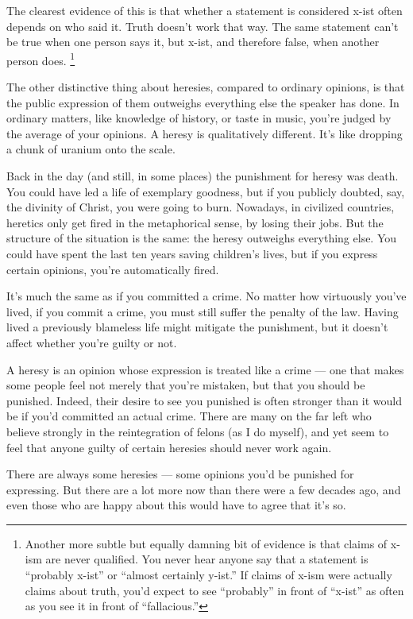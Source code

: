 The clearest evidence of this is that whether a statement is considered
x-ist often depends on who said it. Truth doesn't work that way. The
same statement can't be true when one person says it, but x-ist, and
therefore false, when another person does. \footnote{Another more subtle but equally damning bit of evidence is that
claims of x-ism are never qualified. You never hear anyone say that a
statement is ``probably x-ist'' or ``almost certainly y-ist.'' If claims
of x-ism were actually claims about truth, you'd expect to see
``probably'' in front of ``x-ist'' as often as you see it in front of
``fallacious.''}

The other distinctive thing about heresies, compared to ordinary
opinions, is that the public expression of them outweighs everything
else the speaker has done. In ordinary matters, like knowledge of
history, or taste in music, you're judged by the average of your
opinions. A heresy is qualitatively different. It's like dropping a
chunk of uranium onto the scale.

Back in the day (and still, in some places) the punishment for heresy
was death. You could have led a life of exemplary goodness, but if you
publicly doubted, say, the divinity of Christ, you were going to burn.
Nowadays, in civilized countries, heretics only get fired in the
metaphorical sense, by losing their jobs. But the structure of the
situation is the same: the heresy outweighs everything else. You could
have spent the last ten years saving children's lives, but if you
express certain opinions, you're automatically fired.

It's much the same as if you committed a crime. No matter how virtuously
you've lived, if you commit a crime, you must still suffer the penalty
of the law. Having lived a previously blameless life might mitigate the
punishment, but it doesn't affect whether you're guilty or not.

A heresy is an opinion whose expression is treated like a crime --- one
that makes some people feel not merely that you're mistaken, but that
you should be punished. Indeed, their desire to see you punished is
often stronger than it would be if you'd committed an actual crime.
There are many on the far left who believe strongly in the reintegration
of felons (as I do myself), and yet seem to feel that anyone guilty of
certain heresies should never work again.

There are always some heresies --- some opinions you'd be punished for
expressing. But there are a lot more now than there were a few decades
ago, and even those who are happy about this would have to agree that
it's so.


